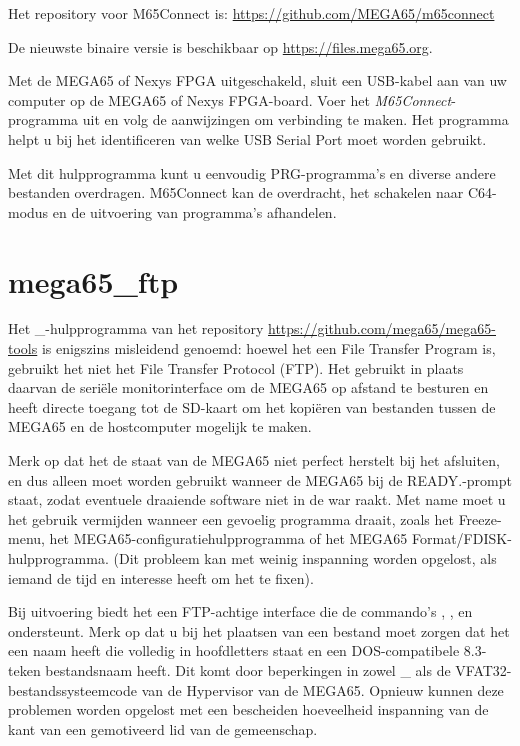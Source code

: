 Het repository voor M65Connect is: \url{https://github.com/MEGA65/m65connect}

De nieuwste binaire versie is beschikbaar op \url{https://files.mega65.org}.

Met de MEGA65 of Nexys FPGA uitgeschakeld, sluit een USB-kabel aan van uw computer op de MEGA65 of Nexys FPGA-board. Voer het \textit{M65Connect}-programma uit en volg de aanwijzingen om verbinding te maken. Het programma helpt u bij het identificeren van welke USB Serial Port moet worden gebruikt.

Met dit hulpprogramma kunt u eenvoudig PRG-programma's en diverse andere bestanden overdragen. M65Connect kan de overdracht, het schakelen naar C64-modus en de uitvoering van programma's afhandelen.

\section{mega65\_ftp}

Het \_-hulpprogramma van
het repository \url{https://github.com/mega65/mega65-tools} is
enigszins misleidend genoemd: hoewel het
een File Transfer Program is, gebruikt het niet het File Transfer
Protocol (FTP). Het gebruikt in plaats daarvan de seriële monitorinterface om
de MEGA65 op afstand te besturen en heeft directe toegang tot de SD-kaart om het
kopiëren van bestanden tussen de MEGA65 en de hostcomputer mogelijk te maken.

Merk op dat het de staat van de MEGA65 niet perfect herstelt bij het afsluiten,
en dus alleen moet worden gebruikt wanneer de MEGA65 bij de READY.-prompt staat,
zodat eventuele draaiende software niet in de war raakt. Met name moet u
het gebruik vermijden wanneer een gevoelig programma draait, zoals
het Freeze-menu, het MEGA65-configuratiehulpprogramma of het MEGA65
Format/FDISK-hulpprogramma. (Dit probleem kan met weinig
inspanning worden opgelost, als iemand de tijd en interesse heeft om het te fixen).

Bij uitvoering biedt het een FTP-achtige interface die de
commando's , ,  en  ondersteunt.
Merk op dat u bij het plaatsen van een bestand moet zorgen dat het een
naam heeft die volledig in hoofdletters staat en een DOS-compatibele 8.3-teken
bestandsnaam heeft. Dit komt door beperkingen in zowel \_ als de
VFAT32-bestandssysteemcode van de Hypervisor van de MEGA65. Opnieuw kunnen deze problemen
worden opgelost met een bescheiden hoeveelheid inspanning van de kant van een
gemotiveerd lid van de gemeenschap.

